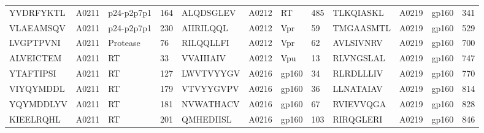 \begin{table}[htp]
\begin{center}
\begin{sideways}
{\begin{tabulary}{1.5\textwidth}{|l|l|l|l|l|l|l|l|l|l|l|l|}
YVDRFYKTL & A0211 & p24-p2p7p1 & 164 & ALQDSGLEV & A0212 & RT & 485 & TLKQIASKL & A0219 & gp160 & 341 \\
VLAEAMSQV & A0211 & p24-p2p7p1 & 230 & AIIRILQQL & A0212 & Vpr & 59 & TMGAASMTL & A0219 & gp160 & 529 \\
LVGPTPVNI & A0211 & Protease & 76 & RILQQLLFI & A0212 & Vpr & 62 & AVLSIVNRV & A0219 & gp160 & 700 \\
ALVEICTEM & A0211 & RT & 33 & VVAIIIAIV & A0212 & Vpu & 13 & RLVNGSLAL & A0219 & gp160 & 747 \\
YTAFTIPSI & A0211 & RT & 127 & LWVTVYYGV & A0216 & gp160 & 34 & RLRDLLLIV & A0219 & gp160 & 770 \\
VIYQYMDDL & A0211 & RT & 179 & VTVYYGVPV & A0216 & gp160 & 36 & LLNATAIAV & A0219 & gp160 & 814 \\
YQYMDDLYV & A0211 & RT & 181 & NVWATHACV & A0216 & gp160 & 67 & RVIEVVQGA & A0219 & gp160 & 828 \\
KIEELRQHL & A0211 & RT & 201 & QMHEDIISL & A0216 & gp160 & 103 & RIRQGLERI & A0219 & gp160 & 846 \bigstrut[b] \\
\hline
\end{tabulary}
}
\end{sideways}
\end{center}
\end{table}

